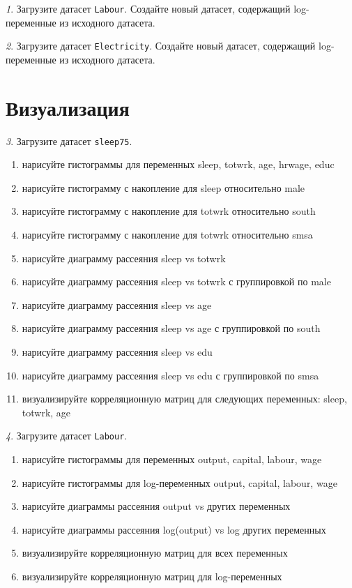 \documentclass[12pt]{article}
\theoremstyle{remark}
\newtheorem{exercise}{}[section]
\begin{document}
\begin{exercise}
Загрузите датасет \texttt{Labour}. Создайте новый датасет, 
содержащий log-переменные из исходного датасета.
\end{exercise}

\begin{exercise}
Загрузите датасет \texttt{Electricity}. Создайте новый датасет, 
содержащий log-переменные из исходного датасета.
\end{exercise}

\section{Визуализация}

\begin{exercise}
Загрузите датасет \texttt{sleep75}.
\begin{enumerate}
	\item нарисуйте гистограммы для переменных sleep, totwrk, age, hrwage, educ
	\item нарисуйте гистограмму с накопление для sleep относительно male 
	\item нарисуйте гистограмму с накопление для totwrk относительно south 
	\item нарисуйте гистограмму с накопление для totwrk относительно smsa 
	\item нарисуйте диаграмму рассеяния sleep vs totwrk
	\item нарисуйте диаграмму рассеяния sleep vs totwrk с группировкой по male
	\item нарисуйте диаграмму рассеяния sleep vs age
	\item нарисуйте диаграмму рассеяния sleep vs age с группировкой по south
	\item нарисуйте диаграмму рассеяния sleep vs edu
	\item нарисуйте диаграмму рассеяния sleep vs edu с группировкой по smsa
	\item визуализируйте корреляционную матриц для следующих переменных: sleep, totwrk, age
\end{enumerate}
\end{exercise}

\begin{exercise}
Загрузите датасет \texttt{Labour}.
\begin{enumerate}
	\item нарисуйте гистограммы для переменных output, capital, labour, wage
	\item нарисуйте гистограммы для log-переменных output, capital, labour, wage
	\item нарисуйте диаграммы рассеяния output vs других переменных
	\item нарисуйте диаграммы рассеяния log(output) vs log других переменных
	\item визуализируйте корреляционную матриц для всех переменных
	\item визуализируйте корреляционную матриц для log-переменных
\end{enumerate}
\end{exercise}
\end{document}
